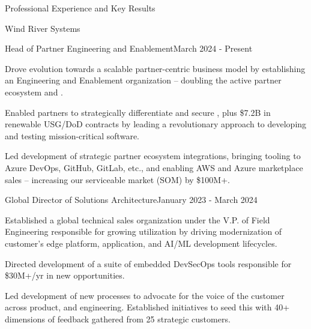 \documentclass{resume} %
\begin{document}


\begin{rSection}{Professional Experience and Key Results}

  \begin{rCompany}{Wind River Systems}{}{}
    \begin{rRole}{Head of Partner Engineering and Enablement}{}{March 2024 - Present}
      \item Drove evolution towards a scalable partner-centric business model by establishing an Engineering and Enablement organization -- doubling the active partner ecosystem and .
      \item Enabled partners to strategically differentiate and secure , plus \$7.2B in renewable USG/DoD contracts by leading a revolutionary approach to developing and testing mission-critical software.
      \item Led development of strategic partner ecosystem integrations, bringing tooling to Azure DevOps, GitHub, GitLab, etc., and enabling AWS and Azure marketplace sales -- increasing our serviceable market (SOM) by \$100M+.
    \end{rRole}
    
    \begin{rRole}{Global Director of Solutions Architecture}{}{January 2023 - March 2024}
      \item Established a global technical sales organization under the V.P. of Field Engineering responsible for growing utilization by driving modernization of customer's edge platform, application, and AI/ML development lifecycles.
      \item Directed development of a suite of embedded DevSecOps tools responsible for \$30M+/yr in new opportunities.
      \item Led development of new processes to advocate for the voice of the customer across product, and engineering. Established initiatives to seed this with 40+ dimensions of feedback gathered from 25 strategic customers.
    \end{rRole}
  \end{rCompany}


\end{rSection}
\end{document}
